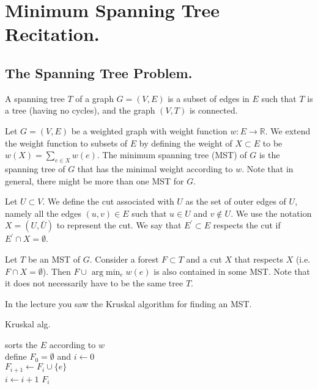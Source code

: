 


\ifdefined\BOOK
\else
\setcounter{chapter}{10}
\fi
\chapter{Minimum Spanning Tree Recitation.} 


\section{The Spanning Tree Problem.}

\begin{definition}
  A spanning tree $T$ of a graph $G=(V,E)$ is a subset of edges in $E$ such that $T$ is a tree (having no cycles), and the graph $(V,T)$ is connected.   
\end{definition}

\begin{problem}[MST] Let $G = (V,E)$ be a weighted graph with weight function $w : E \rightarrow \mathbb{R}$. We extend the weight function to subsets of $E$ by defining the weight of $X\subset E$ to be $w(X)= \sum_{e \in X}w(e)$. The minimum spanning tree (MST) of $G$ is the spanning tree of $G$ that has the minimal weight according to $w$. Note that in general, there might be more than one MST for $G$. 
\end{problem}

\begin{definition}
  Let $U \subset V$. We define the cut associated with $U$ as the set of outer edges of $U$, namely all the edges $(u,v)\in E$ such that $u\in U$ and $v \notin U$. We use the notation $X = (U, \bar{U})$ to represent the cut. We say that $E^{\prime} \subset E$ respects the cut if $E^{\prime} \cap X = \emptyset$.
\end{definition} 

\begin{lemma} 
  Let $T$ be an MST of $G$. Consider a forest $F \subset T$ and a cut $X$ that respects $X$ (i.e. $F \cap X = \emptyset$). Then $F \cup \text{ arg}\min_{e} w(e)$ is also contained in some MST. Note that it does not necessarily have to be the same tree $T$. 
\end{lemma}
 
In the lecture you saw the Kruskal algorithm for finding an MST. \begin{algorithm}
\SetAlgoLined
{}
\caption{ Kruskal alg.}
sorts the $E$ according to $w$ \\
define $F_{0} = \emptyset$ and $i \leftarrow 0$ \\
 {
   {
    $F_{i+1} \leftarrow F_{i} \cup \{e\}$ \\
    $i \leftarrow i + 1$
  }
}
\Return $F_{i}$
\end{algorithm}




